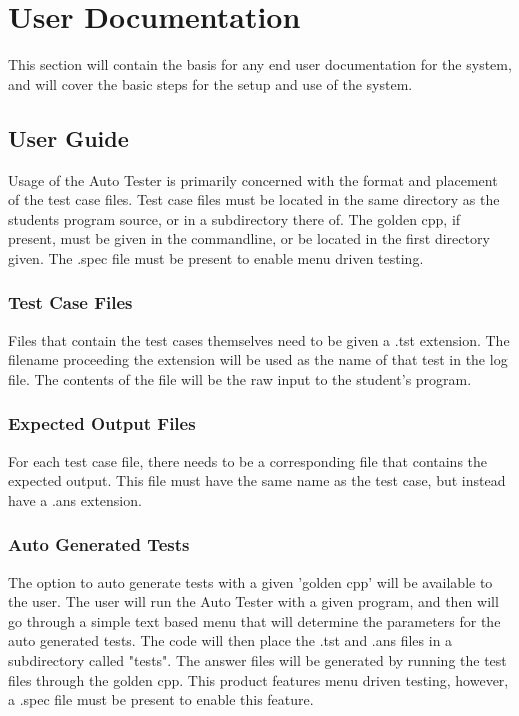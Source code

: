 
\chapter{User Documentation}

This section will contain the basis for any end user documentation for the system, 
and will cover the basic steps for the setup and use of the system.



\section{User Guide}
Usage of the Auto Tester is primarily concerned with the format and placement of the test case files. 
Test case files must be located in the same directory as the students program source, or in a subdirectory 
there of. The golden cpp, if present, must be given in the commandline, or be located in the first directory given. The .spec file must be present to enable menu driven testing.

\subsection{Test Case Files}
Files that contain the test cases themselves need to be given a .tst extension. The filename proceeding the 
extension will be used as the name of that test in the log file. The contents of the file will be the raw 
input to the student's program.

\subsection{Expected Output Files}
For each test case file, there needs to be a corresponding file that contains the expected output. This file 
must have the same name as the test case, but instead have a .ans extension.

\subsection{Auto Generated Tests}
The option to auto generate tests with a given 'golden cpp' will be available to the user. The user will run 
the Auto Tester with a given program, and then will go through a simple text based menu that will determine the 
parameters for the auto generated tests. The code will then place the .tst and .ans files in a subdirectory called "tests". The answer files will be generated by running the test files through the golden cpp. This product features menu driven testing, however, a .spec file must be present to enable this feature.

